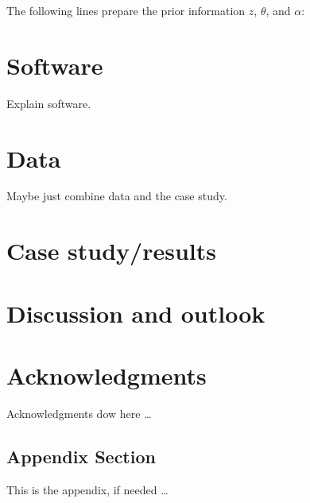\documentclass[article,nojss,shortnames]{jss}
\begin{document}
The following lines prepare the prior information $z$, $\theta$, and $\alpha$:



\section{Software}\label{sec:software}

Explain software.


\section{Data}

Maybe just combine data and the case study.

\section{Case study/results}


\section{Discussion and outlook}




\section*{Acknowledgments}

Acknowledgments dow here \dots


\newpage


\newpage

\begin{appendix}

\section{Appendix Section}

This is the appendix, if needed \dots

\end{appendix}
\end{document}

